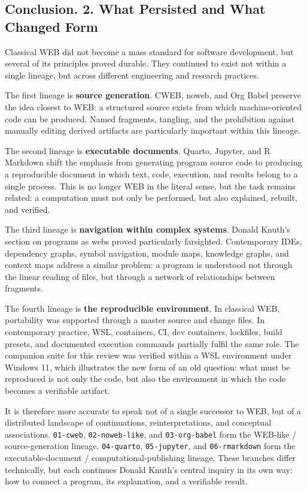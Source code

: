 \documentclass{ZGJournalArticle_2026}
\begin{document}
\subsection{Conclusion. 2. What Persisted and What Changed
Form}\label{conclusion.-2.-what-persisted-and-what-changed-form}

Classical WEB did not become a mass standard for software development,
but several of its principles proved durable. They continued to exist
not within a single lineage, but across different engineering and
research practices.

The first lineage is \textbf{source generation}. CWEB, noweb, and Org
Babel preserve the idea closest to WEB: a structured source exists from
which machine-oriented code can be produced. Named fragments, tangling,
and the prohibition against manually editing derived artifacts are
particularly important within this lineage.

The second lineage is \textbf{executable documents}. Quarto, Jupyter,
and R Markdown shift the emphasis from generating program source code to
producing a reproducible document in which text, code, execution, and
results belong to a single process. This is no longer WEB in the literal
sense, but the task remains related: a computation must not only be
performed, but also explained, rebuilt, and verified.

The third lineage is \textbf{navigation within complex systems}. Donald
Knuth's section on programs as webs proved particularly farsighted.
Contemporary IDEs, dependency graphs, symbol navigation, module maps,
knowledge graphs, and context maps address a similar problem: a program
is understood not through the linear reading of files, but through a
network of relationships between fragments.

The fourth lineage is \textbf{the reproducible environment}. In
classical WEB, portability was supported through a master source and
change files. In contemporary practice, WSL, containers, CI, dev
containers, lockfiles, build presets, and documented execution commands
partially fulfil the same role. The companion suite for this review was
verified within a WSL environment under Windows 11, which illustrates
the new form of an old question: what must be reproduced is not only the
code, but also the environment in which the code becomes a verifiable
artifact.

It is therefore more accurate to speak not of a single successor to WEB,
but of a distributed landscape of continuations, reinterpretations, and
conceptual associations. \texttt{01-cweb}, \texttt{02-noweb-like}, and
\texttt{03-org-babel} form the WEB-like / source-generation lineage.
\texttt{04-quarto}, \texttt{05-jupyter}, and \texttt{06-rmarkdown} form
the executable-document / computational-publishing lineage. These
branches differ technically, but each continues Donald Knuth's central
inquiry in its own way: how to connect a program, its explanation, and a
verifiable result.
\end{document}
